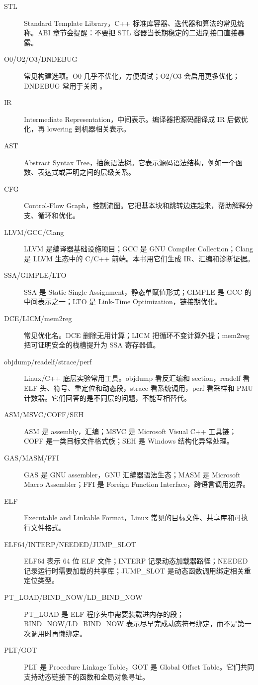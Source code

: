 \begin{description}
  \item[STL] Standard Template Library，C++ 标准库容器、迭代器和算法的常见统称。ABI 章节会提醒：不要把 STL 容器当长期稳定的二进制接口直接暴露。
  \item[O0/O2/O3/DNDEBUG] 常见构建选项。O0 几乎不优化，方便调试；O2/O3 会启用更多优化；DNDEBUG 常用于关闭 。
  \item[IR] Intermediate Representation，中间表示。编译器把源码翻译成 IR 后做优化，再 lowering 到机器相关表示。
  \item[AST] Abstract Syntax Tree，抽象语法树。它表示源码语法结构，例如一个函数、表达式或声明之间的层级关系。
  \item[CFG] Control-Flow Graph，控制流图。它把基本块和跳转边连起来，帮助解释分支、循环和优化。
  \item[LLVM/GCC/Clang] LLVM 是编译器基础设施项目；GCC 是 GNU Compiler Collection；Clang 是 LLVM 生态中的 C/C++ 前端。本书用它们生成 IR、汇编和诊断证据。
  \item[SSA/GIMPLE/LTO] SSA 是 Static Single Assignment，静态单赋值形式；GIMPLE 是 GCC 的中间表示之一；LTO 是 Link-Time Optimization，链接期优化。
  \item[DCE/LICM/mem2reg] 常见优化名。DCE 删除无用计算；LICM 把循环不变计算外提；mem2reg 把可证明安全的栈槽提升为 SSA 寄存器值。
  \item[objdump/readelf/strace/perf] Linux/C++ 底层实验常用工具。objdump 看反汇编和 section，readelf 看 ELF 头、符号、重定位和动态段，strace 看系统调用，perf 看采样和 PMU 计数器。它们回答的是不同层的问题，不能互相替代。
  \item[ASM/MSVC/COFF/SEH] ASM 是 assembly，汇编；MSVC 是 Microsoft Visual C++ 工具链；COFF 是一类目标文件格式族；SEH 是 Windows 结构化异常处理。
  \item[GAS/MASM/FFI] GAS 是 GNU assembler，GNU 汇编器语法生态；MASM 是 Microsoft Macro Assembler；FFI 是 Foreign Function Interface，跨语言调用边界。
  \item[ELF] Executable and Linkable Format，Linux 常见的目标文件、共享库和可执行文件格式。
  \item[ELF64/INTERP/NEEDED/JUMP\_SLOT] ELF64 表示 64 位 ELF 文件；INTERP 记录动态加载器路径；NEEDED 记录运行时需要加载的共享库；JUMP\_SLOT 是动态函数调用绑定相关重定位类型。
  \item[PT\_LOAD/BIND\_NOW/LD\_BIND\_NOW] PT\_LOAD 是 ELF 程序头中需要装载进内存的段；BIND\_NOW/LD\_BIND\_NOW 表示尽早完成动态符号绑定，而不是第一次调用时再懒绑定。
  \item[PLT/GOT] PLT 是 Procedure Linkage Table，GOT 是 Global Offset Table。它们共同支持动态链接下的函数和全局对象寻址。

\end{description}
